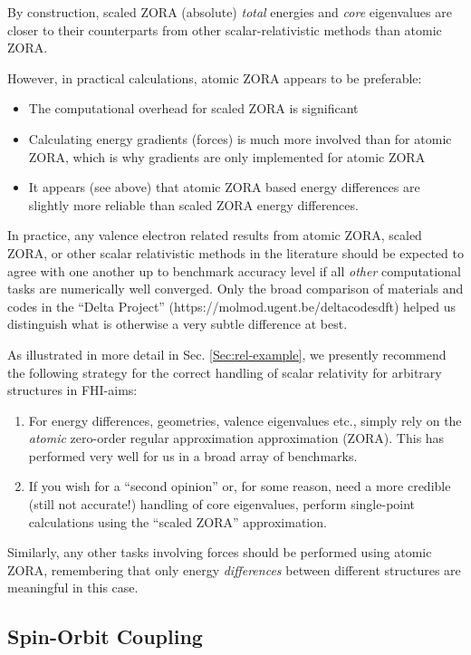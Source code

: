By construction, scaled ZORA (absolute) \emph{total} energies and
\emph{core} eigenvalues are closer to their counterparts from
other scalar-relativistic methods than atomic ZORA. 

However, in practical calculations, atomic ZORA appears to be
preferable: 
\begin{itemize}
  \item The computational overhead for scaled ZORA is significant
  \item Calculating energy gradients (forces) is much more
    involved than for atomic ZORA, which is why gradients are only
    implemented for atomic ZORA
  \item It appears (see above) that atomic ZORA based energy
    differences are slightly more reliable than scaled ZORA energy
    differences. 
\end{itemize}

In practice, any valence electron related results from atomic ZORA,
scaled ZORA, or other scalar relativistic methods in the literature
should be expected to agree with one another up to benchmark accuracy
level if all \emph{other} computational tasks are numerically well
converged. Only the broad comparison of materials and codes in the
``Delta Project'' (https://molmod.ugent.be/deltacodesdft) helped us
distinguish what is otherwise a very subtle difference at best. 

As illustrated in more detail in Sec. \ref{Sec:rel-example}, we
presently recommend the following strategy for the correct handling
of scalar relativity for arbitrary structures in FHI-aims:
\begin{enumerate}
  \item For energy differences, geometries, valence eigenvalues etc.,
    simply rely on the \emph{atomic} zero-order regular approximation
    approximation (ZORA). This has performed very well for us in a
    broad array of benchmarks.
  \item If you wish for a ``second opinion'' or, for some reason, need
    a more credible (still not accurate!) handling of core
    eigenvalues, perform single-point calculations using the ``scaled
    ZORA'' \cite{Lenthe94} approximation. 
\end{enumerate}
Similarly, any other tasks involving forces should be performed using
atomic ZORA, remembering that only energy \emph{differences} between
different structures are meaningful in this case.

\subsection*{Spin-Orbit Coupling}

